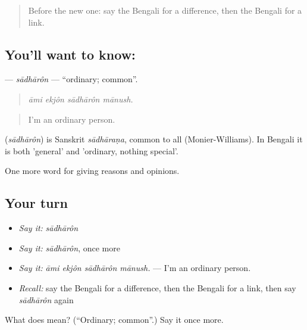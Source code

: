 \begin{quote}
Before the new one: say the Bengali for a difference, then the Bengali for a link.
\end{quote}

\subsection*{You'll want to know: }
\textbf{} — \emph{sādhārôn} — \textquotedblleft{}ordinary; common\textquotedblright{}.

\begin{quote}
   
\end{quote}

\begin{quote}
\emph{āmi ekjôn sādhārôn mānush.}
\end{quote}

\begin{quote}
I'm an ordinary person.
\end{quote}

\begin{cousinweb}
\textbf{} (\emph{sādhārôn}) is Sanskrit \emph{sādhāraṇa}, common to all (Monier-Williams). In Bengali it is both 'general' and 'ordinary, nothing special'.
\end{cousinweb}

\begin{grammarlens}[title={What you've built}]
One more word for giving reasons and opinions.
\end{grammarlens}

\subsection*{Your turn}
\begin{itemize}
\raggedright
  \item \emph{Say it:} \emph{sādhārôn}
  \item \emph{Say it:} \emph{sādhārôn}, once more
  \item \emph{Say it:} \emph{āmi ekjôn sādhārôn mānush.} — I'm an ordinary person.
  \item \emph{Recall:} say the Bengali for a difference, then the Bengali for a link, then say \emph{sādhārôn} again
\end{itemize}

\begin{tcolorbox}[breakable,colback=teal!4,colframe=teal!35!black,title={Before you move on}]
What does  mean? (\textquotedblleft{}Ordinary; common\textquotedblright{}.) Say it once more.
\end{tcolorbox}
